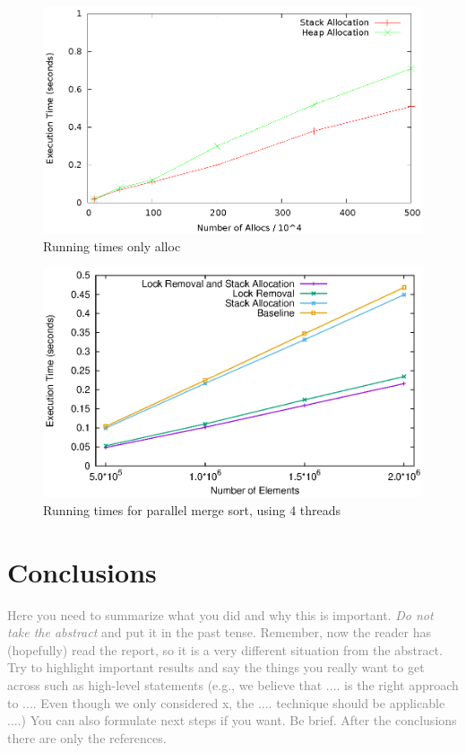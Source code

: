 \documentclass[letterpaper]{article}
\begin{document}
\begin{figure} \center
 \includegraphics[width=0.8\linewidth]{results_only_alloc.eps}
  \caption{Running times only alloc}
  \label{fig:alloc}
\end{figure}

\begin{figure} \center
 \includegraphics[width=0.8\linewidth]{results_merge.eps}
  \caption{Running times for parallel merge sort, using 4 threads}
  \label{fig:merge}
\end{figure}

\section{Conclusions}

\textcolor{gray}{
Here you need to summarize what you did and why this is
important. {\em Do not take the abstract} and put it in the past
tense. Remember, now the reader has (hopefully) read the report, so it
is a very different situation from the abstract. Try to highlight
important results and say the things you really want to get across
such as high-level statements (e.g., we believe that .... is the right
approach to .... Even though we only considered x, the
.... technique should be applicable ....) You can also formulate next
steps if you want. Be brief. After the conclusions there are only the references.
}



\end{document}
